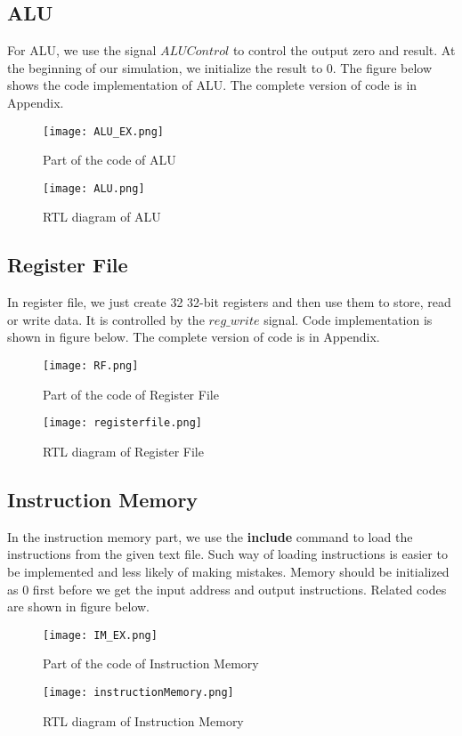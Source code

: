 \documentclass{article}[12pt]
\begin{document}
		\subsection{ALU}
		For ALU, we use the signal $ALU Control$ to control the output zero and result. At the beginning of our simulation, we initialize the result to $0$. The figure below shows the code implementation of ALU. The complete version of code is in Appendix.
			\begin{figure}[H]
				\centering
				\texttt{[image: ALU\_EX.png]}
				\caption{Part of the code of ALU}
			\end{figure}
			\begin{figure}[H]
				\centering
				\texttt{[image: ALU.png]}
				\caption{RTL diagram of ALU}
			\end{figure}
		\subsection{Register File}
		In register file, we just create 32 32-bit registers and then use them to store, read or write data. It is controlled by the $reg\_write$ signal. Code implementation is shown in figure below. The complete version of code is in Appendix.
			
			\begin{figure}[H]
				\centering
				\texttt{[image: RF.png]}
				\caption{Part of the code of Register File}
			\end{figure}
			\begin{figure}[H]
				\centering
				\texttt{[image: registerfile.png]}
				\caption{RTL diagram of Register File}
			\end{figure}
		\subsection{Instruction Memory}
		In the instruction memory part, we use the \textbf{include} command to load the instructions from the given text file. Such way of loading instructions is easier to be implemented and less likely of making mistakes. Memory should be initialized as $0$ first before we get the input address and output instructions. Related codes are shown in figure below.
		\begin{figure}[H]
			\centering
			\texttt{[image: IM\_EX.png]}
			\caption{Part of the code of Instruction Memory}
		\end{figure}
		\begin{figure}[H]
				\centering
				\texttt{[image: instructionMemory.png]}
				\caption{RTL diagram of Instruction Memory}
			\end{figure}
		\newpage
\end{document}
